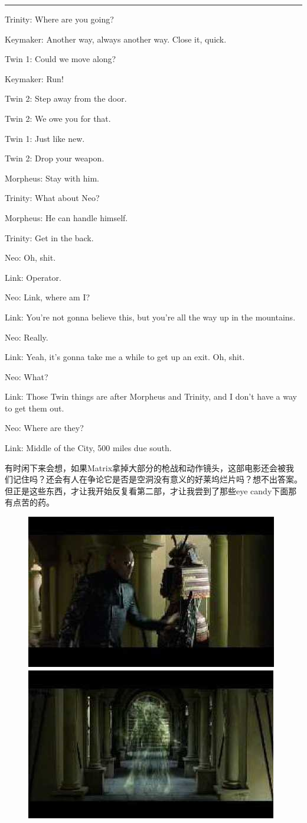 \documentclass[UTF8]{ctexart}
\newcommand{\myparsep}{\noindent \rule[0.5ex]{\linewidth}{1pt}}
\newenvironment{myquote}{\color{green} \setlength{\leftskip}{6em} \setlength{\rightskip}{4em} \setlength{\parindent}{-2em}}{\par}
\begin{document}
\myparsep

\begin{myquote}
Trinity: Where are you going?

Keymaker: Another way, always another way. Close it, quick.

Twin 1: Could we move along?

Keymaker: Run!

Twin 2: Step away from the door.

Twin 2: We owe you for that.

Twin 1: Just like new.

Twin 2: Drop your weapon.

Morpheus: Stay with him.

Trinity: What about Neo?

Morpheus: He can handle himself.

Trinity: Get in the back.

Neo: Oh, shit.

Link: Operator.

Neo: Link, where am I?

Link: You're not gonna believe this, but you're all the way up in the mountains.

Neo: Really.

Link: Yeah, it's gonna take me a while to get up an exit. Oh, shit.

Neo: What?

Link: Those Twin things are after Morpheus and Trinity, and I don't have a way to get them out.

Neo: Where are they?

Link: Middle of the City, 500 miles due south.
\end{myquote}

有时闲下来会想，如果Matrix拿掉大部分的枪战和动作镜头，这部电影还会被我们记住吗？还会有人在争论它是否是空洞没有意义的好莱坞烂片吗？想不出答案。但正是这些东西，才让我开始反复看第二部，才让我尝到了那些eye candy下面那有点苦的药。

\begin{figure}[htb]
\centering
\includegraphics[width=0.45\linewidth]{fig/read_reloaded-126}
\includegraphics[width=0.45\linewidth]{fig/read_reloaded-127}
\end{figure}
\end{document}
